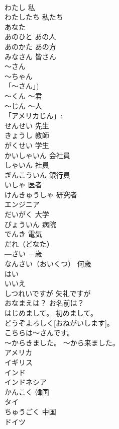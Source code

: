 \documentclass[8pt]{extreport}
\begin{document}
\begin{CJK}{UTF8}{min}
\\	わたし	私	
\\	わたしたち	私たち	
\\	あなた			
\\	あのひと	あの人	
\\	あのかた	あの方	
\\	みなさん	皆さん	
\\	～さん			
\\	～ちゃん			
\\	「～さん」)		
\\	～くん	～君	
\\	～じん	～人	
\\	「アメリカじん」: 
\\	せんせい	先生	
\\	きょうし	教師	
\\	がくせい	学生	
\\	かいしゃいん	会社員	
\\	しゃいん	社員	
\\	ぎんこういん	銀行員	
\\	いしゃ	医者	
\\	けんきゅうしゃ	研究者	
\\	エンジニア			
\\	だいがく	大学	
\\	びょういん	病院	
\\	でんき	電気	
\\	だれ（どなた）			
\\	―さい	－歳	
\\	なんさい（おいくつ）	何歳	
\\	はい			
\\	いいえ			
\\	しつれいですが	失礼ですが	
\\	おなまえは？	お名前は？	
\\	はじめまして。	初めまして。	
\\	どうぞよろしく[おねがいします]。			
\\	こちらは～さんです。			
\\	～からきました。	～から来ました。	
\\	アメリカ			
\\	イギリス			
\\	インド			
\\	インドネシア			
\\	かんこく	韓国	
\\	タイ			
\\	ちゅうごく	中国	
\\	ドイツ			

\end{CJK}
\end{document}
